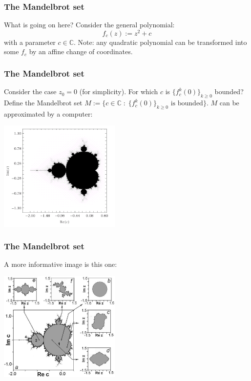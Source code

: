 \documentclass{beamer} %
\theoremstyle{definition} %
\newcommand{\Cplx}{\mathbb{C}}
\begin{document}
\begin{frame}\frametitle{The Mandelbrot set}
    What is going on here?
    Consider the general polynomial:
    \begin{equation*}
        f_c(z) := z^2+c
    \end{equation*}
    with a parameter $c \in \Cplx$.
    Note: any quadratic polynomial can be transformed into some $f_c$ by an affine change of coordinates. 
\end{frame}

\begin{frame}\frametitle{The Mandelbrot set}
    Consider the case $z_0 = 0$ (for simplicity). For which $c$ is $\{f_c^k(0)\}_{k\geq 0}$ bounded?
    Define the Mandelbrot set $M := \{c \in \Cplx\;:\;\{f^k_c(0)\}_{k\geq 0}\text{ is bounded}\}$.
    $M$ can be approximated by a computer:
    \begin{center}
        \includegraphics[width=60mm]{img/mandelbrot.png}
    \end{center}
\end{frame}

\begin{frame}\frametitle{The Mandelbrot set}
    A more informative image is this one:
    \begin{center}
        \includegraphics[width=60mm]{img/mandelbrot-with-captions.png}
    \end{center}
\end{frame}
\end{document}
